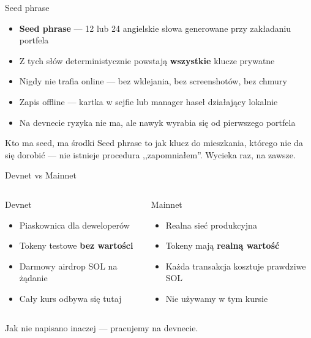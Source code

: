\begin{frame}{Seed phrase}
  \begin{itemize}
    \item \textbf{Seed phrase} --- 12 lub 24 angielskie słowa generowane przy zakładaniu portfela
    \item Z tych słów deterministycznie powstają \textbf{wszystkie} klucze prywatne
    \item Nigdy nie trafia online --- bez wklejania, bez screenshotów, bez chmury
    \item Zapis offline --- kartka w sejfie lub manager haseł działający lokalnie
    \item Na devnecie ryzyka nie ma, ale nawyk wyrabia się od pierwszego portfela
  \end{itemize}
  \vspace{0.25cm}
  \begin{alertblock}{Kto ma seed, ma środki}
    Seed phrase to jak klucz do mieszkania, którego nie da się dorobić ---
    nie istnieje procedura ,,zapomniałem''. Wycieka raz, na zawsze.
  \end{alertblock}
\end{frame}

\begin{frame}{Devnet vs Mainnet}
  \begin{columns}
      \begin{block}{Devnet}
        \begin{itemize}
          \item Piaskownica dla deweloperów
          \item Tokeny testowe \textbf{bez wartości}
          \item Darmowy airdrop SOL na żądanie
          \item Cały kurs odbywa się tutaj
        \end{itemize}
      \end{block}

      \begin{alertblock}{Mainnet}
        \begin{itemize}
          \item Realna sieć produkcyjna
          \item Tokeny mają \textbf{realną wartość}
          \item Każda transakcja kosztuje prawdziwe SOL
          \item Nie używamy w tym kursie
        \end{itemize}
      \end{alertblock}
  \end{columns}
  \vspace{0.3cm}
  \begin{center}
    \textcolor{stplmuted}{Jak nie napisano inaczej --- pracujemy na devnecie.}
  \end{center}
\end{frame}

